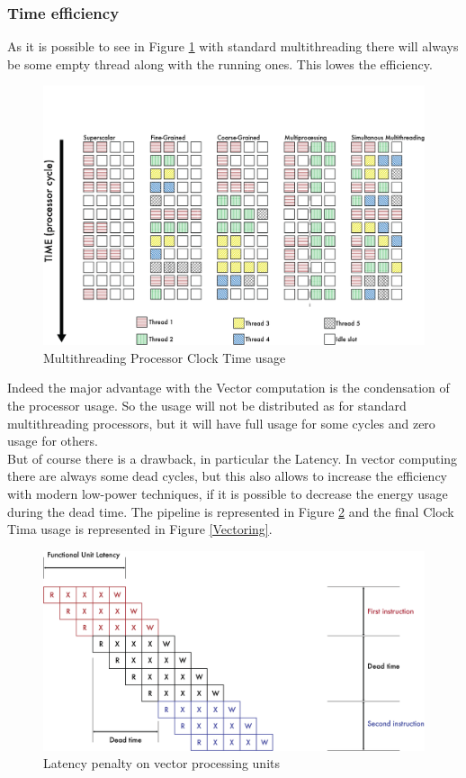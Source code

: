 \subsubsection{Time efficiency}
As it is possible to see in Figure \ref{Multithreading} with standard multithreading there will always be some empty thread along with the running ones. This lowes the efficiency.
\begin{figure}[H]
    \centering
    \includegraphics[scale = 0.43]{Chapter_1/img/threads.png}
    \caption{Multithreading Processor Clock Time usage  \cite{L15-Krste}}
    \label{Multithreading}
\end{figure}

Indeed the major advantage with the Vector computation is the condensation of the processor usage. 
So the usage will not be distributed as for standard multithreading processors, but it will have full usage for some cycles and zero usage for others\cite{L15-Krste}.\\

But of course there is a drawback, in particular the Latency. In vector computing there are always some dead cycles, but this also allows to increase the efficiency with modern low-power techniques, if it is possible to decrease the energy usage during the dead time.
The pipeline is represented in Figure \ref{Vector-Latency} and the final Clock Tima usage is represented in Figure \ref{Vectoring}.

\begin{figure}[H]
    \centering
    \includegraphics[scale = 0.55]{Chapter_1/img/lat-pen.png}
    \caption{Latency penalty on vector processing units \cite{L15-Krste}}
    \label{Vector-Latency}
\end{figure}

